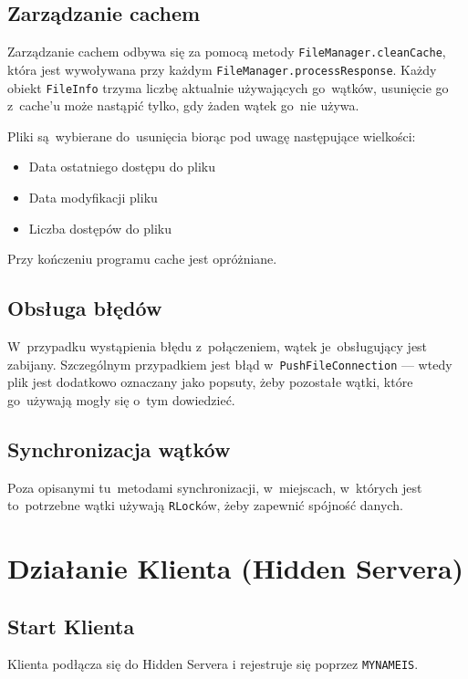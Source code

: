\documentclass[a4paper,notitlepage]{article}
\begin{document}
\subsection{Zarządzanie cachem}
Zarządzanie cachem odbywa się za pomocą metody \texttt{FileManager.cleanCache},
która jest wywoływana przy każdym \texttt{FileManager.processResponse}.
Każdy obiekt \texttt{FileInfo} trzyma liczbę aktualnie używających go~wątków,
usunięcie go z~cache'u może nastąpić tylko, gdy żaden wątek go~nie używa.

Pliki są~wybierane do~usunięcia biorąc pod uwagę następujące wielkości:
\begin{itemize}
\item Data ostatniego dostępu do pliku
\item Data modyfikacji pliku
\item Liczba dostępów do pliku
\end{itemize}

Przy kończeniu programu cache jest opróżniane.

\subsection{Obsługa błędów}
W~przypadku wystąpienia błędu z~połączeniem, wątek je~obsługujący jest
zabijany. Szczególnym przypadkiem jest błąd w~\texttt{PushFileConnection}
--- wtedy plik jest dodatkowo oznaczany jako popsuty, żeby pozostałe 
wątki, które go~używają mogły się o~tym dowiedzieć.

\subsection{Synchronizacja wątków}
Poza opisanymi tu~metodami synchronizacji, w~miejscach, w~których jest 
to~potrzebne wątki używają \texttt{RLock}ów, żeby zapewnić spójność
danych.

\section{Działanie Klienta (Hidden Servera)}
\subsection{Start Klienta}
Klienta podłącza się do Hidden Servera i rejestruje się poprzez \texttt{MYNAMEIS}.
\end{document}
